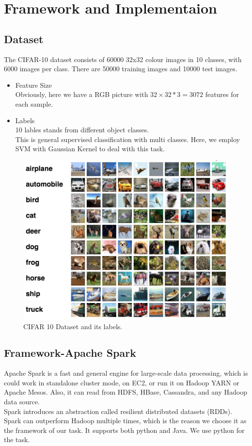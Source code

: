\documentclass[a4paper]{article}
\begin{document}
\section{Framework and Implementaion}

\subsection{Dataset}
The CIFAR-10 dataset consists of 60000 32x32 colour images in 10 classes, with 6000 images per class. There are 50000 training images and 10000 test images.

\begin{itemize}
\item Feature Size\\
Obviously, here we have a RGB picture with $32 \times 32 *3 = 3072$ features for each sample.
\item Labels\\
10 lables stands from different object classes.\\
This is general supervised classification with multi classes. Here, we employ SVM with Gaussian Kernel to deal with this task.
\end{itemize}

\begin{figure}[!htb]
\centering
\includegraphics[width=1.0\textwidth]{cifar}
\caption{\label{fig:cifar}CIFAR 10 Dataset and its labels.}
\end{figure}

\subsection{Framework-Apache Spark}
Apache Spark is a fast and general engine for large-scale data processing, which is could work in standalone cluster mode, on EC2, or run it on Hadoop YARN or Apache Mesos. Also, it can read from HDFS, HBase, Cassandra, and any Hadoop data source.\\
Spark introduces an abstraction called resilient distributed datasets (RDDs). Spark can outperform Hadoop multiple times, which is the reason we choose it as the framework of our task. It supports both python and Java. We use python for the task. 
\end{document}
